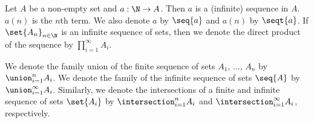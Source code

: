 
Let $A$ be a non-empty set and $a: \N \to A$.
Then $a$ is a (infinite) sequence in $A$.
$a(n)$ is the $n$th term.
We also denote $a$ by $\seq{a}$ and $a(n)$ by $\seqt{a}$.
If $\set{A_n}_{n \in \N}$ is an infinite sequence of sets, then we denote the direct product of the sequence by $\prod_{i = 1}^{\infty} A_i$.


We denote the family union of the finite sequence of sets $A_1$, $\dots$, $A_n$ by $\union_{i = 1}^{n} A_i$.
We denote the family of the infinite sequence of sets $\seq{A}$ by $\union_{i = 1}^{\infty} A_i$.
Similarly, we denote the intersections of a finite and infinite sequence of sets $\set{A_i}$ by $\intersection_{i = 1}^{n} A_i$ and $\intersection_{i = 1}^{\infty} A_i$, respectively.


%



%
%
%
%
%
